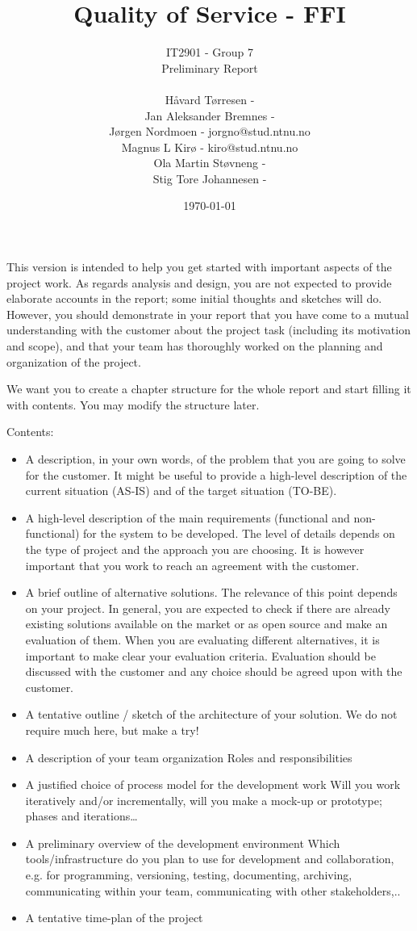 \documentclass[12pt]{article}
\title{Quality of Service - FFI}
\author{
        IT2901 - Group 7  \\ 
        Preliminary Report 
        \\ \\
        Håvard Tørresen - \\
        Jan Aleksander Bremnes - \\
        Jørgen Nordmoen - jorgno@stud.ntnu.no\\
        Magnus L Kirø - kiro@stud.ntnu.no\\
        Ola Martin Støvneng - \\
        Stig Tore Johannesen - \\
}
\date{\today}
\begin{document}
\maketitle
\titlepage
{}

\begin{should contain}
    This version is intended to help you get started with important aspects of the project work. As regards analysis and design, you are not expected to provide elaborate accounts in the report; some initial thoughts and sketches will do. However, you should demonstrate in your report that you have come to a mutual understanding with the customer about the project task (including its motivation and scope), and that your team has thoroughly worked on the planning and organization of the project. 

    We want you to create a chapter structure for the whole report and start filling it with contents. You may modify the structure later. 

    Contents:
    \begin{itemize}
    \item A description, in your own words, of the problem that you are going to solve for the customer. It might be useful to provide a high-level description of the current situation (AS-IS) and of the target situation (TO-BE).
    \item A high-level description of the main requirements (functional and non-functional) for the system to be developed. The level of details depends on the type of project and the approach you are choosing. It is however important that you work to reach an agreement with the customer.
    \item A brief outline of alternative solutions. The relevance of this point depends on your project. In general, you are expected to check if there are already existing solutions available on the market or as open source and make an evaluation of them. When you are evaluating different alternatives, it is important to make clear your evaluation criteria. Evaluation should be discussed with the customer and any choice should be agreed upon with the customer.
    \item A tentative outline / sketch of the architecture of your solution. 
    We do not require much here, but make a try!
    \item A description of your team organization
    Roles and responsibilities
    \item A justified choice of process model for the development work 
    Will you work iteratively and/or incrementally, will you make a mock-up or prototype; phases and iterations…
    \item A preliminary overview of the development environment 
    Which tools/infrastructure do you plan to use for development and collaboration, e.g. for programming, versioning, testing, documenting, archiving, communicating within your team, communicating with other stakeholders,..
    \item A tentative time-plan of the project
    \end{itemize}
\end{should contain}
\end{document}
